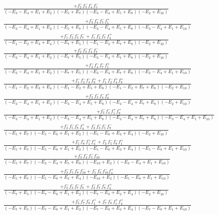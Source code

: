 \documentclass{article}
\begin{document}
\[\begin{array}{rcl}
\frac{+f_{2}^{-}f_{3}^{-}f_{4}^{-}f_{5}^{-}}{(-E_{3}-E_{4}+E_{1}+E_{2})(-E_{5}+E_{7})(-E_{3}-E_{4}+E_{5}+E_{8})(-E_{2}+E_{10})}\\
\frac{+f_{3}^{-}f_{4}^{-}f_{5}^{-}f_{1}^{+}}{(-E_{3}-E_{4}+E_{1}+E_{2})(-E_{5}+E_{7})(-E_{3}-E_{4}+E_{5}+E_{8})(-E_{3}-E_{4}+E_{1}+E_{10})}\\
\frac{+f_{1}^{-}f_{2}^{-}f_{3}^{-}f_{7}^{-}+f_{1}^{-}f_{2}^{-}f_{7}^{-}f_{4}^{+}}{(-E_{1}-E_{2}+E_{3}+E_{4})(-E_{7}+E_{5})(-E_{1}-E_{2}+E_{7}+E_{8})(-E_{2}+E_{10})}\\
\frac{+f_{2}^{-}f_{3}^{-}f_{4}^{-}f_{7}^{-}}{(-E_{3}-E_{4}+E_{1}+E_{2})(-E_{7}+E_{5})(-E_{3}-E_{4}+E_{7}+E_{8})(-E_{2}+E_{10})}\\
\frac{+f_{3}^{-}f_{4}^{-}f_{7}^{-}f_{1}^{+}}{(-E_{3}-E_{4}+E_{1}+E_{2})(-E_{7}+E_{5})(-E_{3}-E_{4}+E_{7}+E_{8})(-E_{3}-E_{4}+E_{1}+E_{10})}\\
\frac{+f_{1}^{-}f_{2}^{-}f_{3}^{-}f_{8}^{+}+f_{1}^{-}f_{2}^{-}f_{4}^{+}f_{8}^{+}}{(-E_{1}-E_{2}+E_{3}+E_{4})(-E_{1}-E_{2}+E_{5}+E_{8})(-E_{1}-E_{2}+E_{7}+E_{8})(-E_{2}+E_{10})}\\
\frac{+f_{2}^{-}f_{3}^{-}f_{4}^{-}f_{8}^{+}}{(-E_{3}-E_{4}+E_{1}+E_{2})(-E_{3}-E_{4}+E_{5}+E_{8})(-E_{3}-E_{4}+E_{7}+E_{8})(-E_{2}+E_{10})}\\
\frac{+f_{3}^{-}f_{4}^{-}f_{1}^{+}f_{8}^{+}}{(-E_{3}-E_{4}+E_{1}+E_{2})(-E_{3}-E_{4}+E_{5}+E_{8})(-E_{3}-E_{4}+E_{7}+E_{8})(-E_{3}-E_{4}+E_{1}+E_{10})}\\
\frac{+f_{2}^{-}f_{5}^{-}f_{8}^{-}f_{4}^{+}+f_{2}^{-}f_{3}^{-}f_{5}^{-}f_{8}^{-}}{(-E_{5}+E_{7})(-E_{5}-E_{8}+E_{1}+E_{2})(-E_{5}-E_{8}+E_{3}+E_{4})(-E_{2}+E_{10})}\\
\frac{+f_{5}^{-}f_{8}^{-}f_{1}^{+}f_{4}^{+}+f_{3}^{-}f_{5}^{-}f_{8}^{-}f_{1}^{+}}{(-E_{5}+E_{7})(-E_{5}-E_{8}+E_{1}+E_{2})(-E_{5}-E_{8}+E_{3}+E_{4})(-E_{5}-E_{8}+E_{1}+E_{10})}\\
\frac{+f_{3}^{-}f_{4}^{-}f_{5}^{-}f_{10}^{-}}{(-E_{5}+E_{7})(-E_{3}-E_{4}+E_{5}+E_{8})(-E_{10}+E_{2})(-E_{3}-E_{4}+E_{1}+E_{10})}\\
\frac{+f_{3}^{-}f_{5}^{-}f_{8}^{-}f_{10}^{-}+f_{5}^{-}f_{8}^{-}f_{10}^{-}f_{4}^{+}}{(-E_{5}+E_{7})(-E_{5}-E_{8}+E_{3}+E_{4})(-E_{10}+E_{2})(-E_{5}-E_{8}+E_{1}+E_{10})}\\
\frac{+f_{2}^{-}f_{3}^{-}f_{7}^{-}f_{8}^{-}+f_{2}^{-}f_{7}^{-}f_{8}^{-}f_{4}^{+}}{(-E_{7}+E_{5})(-E_{7}-E_{8}+E_{1}+E_{2})(-E_{7}-E_{8}+E_{3}+E_{4})(-E_{2}+E_{10})}\\
\frac{+f_{3}^{-}f_{7}^{-}f_{8}^{-}f_{1}^{+}+f_{7}^{-}f_{8}^{-}f_{1}^{+}f_{4}^{+}}{(-E_{7}+E_{5})(-E_{7}-E_{8}+E_{1}+E_{2})(-E_{7}-E_{8}+E_{3}+E_{4})(-E_{7}-E_{8}+E_{1}+E_{10})}\\

\end{array}\]
\end{document}
